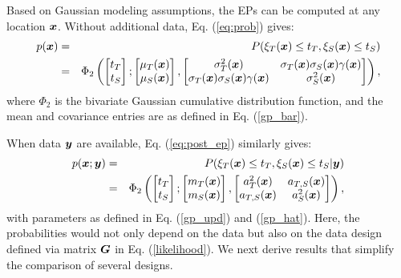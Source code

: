 \documentclass[aoas]{imsart}
\begin{document}
Based on Gaussian modeling assumptions, the EPs can be computed at any
location ${\boldsymbol x}$. Without additional data, Eq.  (\ref{eq:prob}) gives:
\begin{eqnarray}\label{eq:prob_mv0}
 p(\bx) &=& P(\xi_T(\bx) \leq t_T, \xi_S(\bx) \leq t_S) \nonumber \\
 &=& \Phi_2 \begin{pmatrix} 
\begin{bmatrix} t_T\\
t_S
\end{bmatrix};
\begin{bmatrix} \mu_{T}(\bx)\\
\mu_{S}(\bx)
\end{bmatrix},\begin{bmatrix}
\sigma_{T}^2(\bx) & \sigma_{T}(\bx)\sigma_{S}(\bx) \gamma(\bx)  \\
\sigma_{T}(\bx)\sigma_{S}(\bx) \gamma(\bx)  & \sigma_{S}^2(\bx)  
\end{bmatrix}\end{pmatrix},
\end{eqnarray}
where $\Phi_2$ is the bivariate Gaussian cumulative distribution
function, and the mean and covariance entries are as defined in
Eq. (\ref{gp_bar}).

When data ${\boldsymbol y}$ are available, Eq. (\ref{eq:post_ep}) similarly gives:
\begin{eqnarray}\label{eq:prob_mv}
 p(\bx;\by) &=& P(\xi_T(\bx) \leq t_T, \xi_S(\bx) \leq t_S |\by)
 \nonumber \\
 &=& \Phi_2 \begin{pmatrix} 
\begin{bmatrix} t_T\\
t_S
\end{bmatrix};
\begin{bmatrix} m_{T}(\bx)\\
m_{S}(\bx)
\end{bmatrix},\begin{bmatrix}
a_{T}^2(\bx) & a_{T,S}(\bx)  \\
a_{T,S}(\bx)  & a_{S}^2(\bx)  
\end{bmatrix}\end{pmatrix},
\end{eqnarray}
with parameters as defined in Eq. (\ref{gp_upd}) and
(\ref{gp_hat}). Here, the probabilities would not only depend on the
data but also on the data design defined via matrix ${\boldsymbol G}$ in
Eq. (\ref{likelihood}). We next derive results that simplify the
comparison of several designs.
\end{document}
